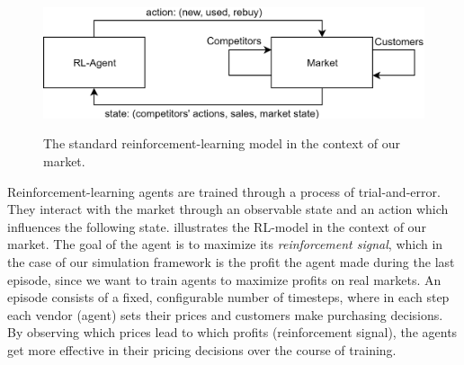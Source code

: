 \begin{figure}
	\centering
	\includegraphics[width = \textwidth]{images/RL_overview.png}\\[1 ex]
	\caption{The standard reinforcement-learning model in the context of our market.}\label{fig:IntroRLDiagram}
\end{figure}

Reinforcement-learning agents are trained through a process of trial-and-error. They interact with the market through an observable state and an action which influences the following state.  illustrates the RL-model in the context of our market. The goal of the agent is to maximize its \emph{reinforcement signal}, which in the case of our simulation framework is the profit the agent made during the last episode, since we want to train agents to maximize profits on real markets. An episode consists of a fixed, configurable number of timesteps, where in each step each vendor (agent) sets their prices and customers make purchasing decisions. By observing which prices lead to which profits (reinforcement signal), the agents get more effective in their pricing decisions over the course of training.
